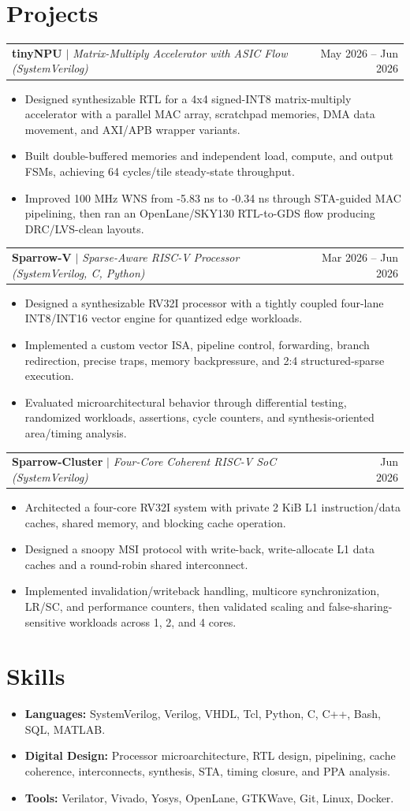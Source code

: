 \documentclass[10pt,letterpaper]{article}
\newcommand{\resumeItem}[1]{\item #1}
\newcommand{\resumeProjectHeading}[3]{%
  \begin{tabularx}{\textwidth}{X r}
    \textbf{#1} \textit{#2} & #3 \\
  \end{tabularx}\vspace{0pt}
}
\newenvironment{resumeItemList}{\begin{small}\begin{itemize}[leftmargin=*, itemsep=2pt, topsep=3pt, parsep=0pt]}{\end{itemize}\end{small}\vspace{4pt}}
\begin{document}
\section*{Projects}
\resumeProjectHeading{tinyNPU}{$\mid$ Matrix-Multiply Accelerator with ASIC Flow (SystemVerilog)}{May 2026 -- Jun 2026}
\begin{resumeItemList}
    \resumeItem{Designed synthesizable RTL for a 4x4 signed-INT8 matrix-multiply accelerator with a parallel MAC array, scratchpad memories, DMA data movement, and AXI/APB wrapper variants.}
    \resumeItem{Built double-buffered memories and independent load, compute, and output FSMs, achieving 64 cycles/tile steady-state throughput.}
    \resumeItem{Improved 100 MHz WNS from -5.83 ns to -0.34 ns through STA-guided MAC pipelining, then ran an OpenLane/SKY130 RTL-to-GDS flow producing DRC/LVS-clean layouts.}
\end{resumeItemList}
\resumeProjectHeading{Sparrow-V}{$\mid$ Sparse-Aware RISC-V Processor (SystemVerilog, C, Python)}{Mar 2026 -- Jun 2026}
\begin{resumeItemList}
    \resumeItem{Designed a synthesizable RV32I processor with a tightly coupled four-lane INT8/INT16 vector engine for quantized edge workloads.}
    \resumeItem{Implemented a custom vector ISA, pipeline control, forwarding, branch redirection, precise traps, memory backpressure, and 2:4 structured-sparse execution.}
    \resumeItem{Evaluated microarchitectural behavior through differential testing, randomized workloads, assertions, cycle counters, and synthesis-oriented area/timing analysis.}
\end{resumeItemList}
\resumeProjectHeading{Sparrow-Cluster}{$\mid$ Four-Core Coherent RISC-V SoC (SystemVerilog)}{Jun 2026}
\begin{resumeItemList}
    \resumeItem{Architected a four-core RV32I system with private 2 KiB L1 instruction/data caches, shared memory, and blocking cache operation.}
    \resumeItem{Designed a snoopy MSI protocol with write-back, write-allocate L1 data caches and a round-robin shared interconnect.}
    \resumeItem{Implemented invalidation/writeback handling, multicore synchronization, LR/SC, and performance counters, then validated scaling and false-sharing-sensitive workloads across 1, 2, and 4 cores.}
\end{resumeItemList}
\vspace{-0.5em}
\section*{Skills}
\begin{resumeItemList}
    \resumeItem{\textbf{Languages:} SystemVerilog, Verilog, VHDL, Tcl, Python, C, C++, Bash, SQL, MATLAB.}
    \resumeItem{\textbf{Digital Design:} Processor microarchitecture, RTL design, pipelining, cache coherence, interconnects, synthesis, STA, timing closure, and PPA analysis.}
    \resumeItem{\textbf{Tools:} Verilator, Vivado, Yosys, OpenLane, GTKWave, Git, Linux, Docker.}
\end{resumeItemList}
\end{document}

